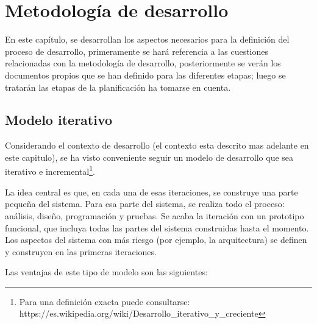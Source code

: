 \chapter{Metodología de desarrollo}

En este capítulo, se desarrollan los aspectos necesarios para la definición del 
proceso de desarrollo, primeramente se hará referencia a las cuestiones 
relacionadas con la metodología de desarrollo, posteriormente se verán los
documentos propios que se han definido para las diferentes etapas; luego se
tratarán las etapas de la planificación ha tomarse en cuenta.

\section{Modelo iterativo}

Considerando el contexto de desarrollo (el contexto esta descrito mas adelante
en este capitulo), se ha visto conveniente seguir un modelo de desarrollo que
sea iterativo e incremental\footnote{Para una definición exacta puede
consultarse: https://es.wikipedia.org/wiki/Desarrollo\_iterativo\_y\_creciente}.

La idea central es que, en cada una de esas iteraciones, se construye una parte
pequeña del sistema. Para esa parte del sistema, se realiza todo el proceso:
análisis, diseño, programación y pruebas. Se acaba la iteración con un
prototipo funcional, que incluya todas las partes del sistema construidas hasta
el momento. Los aspectos del sistema con más riesgo (por ejemplo, la
arquitectura) se definen y construyen en las primeras iteraciones.

Las ventajas de este tipo de modelo son las siguientes:

